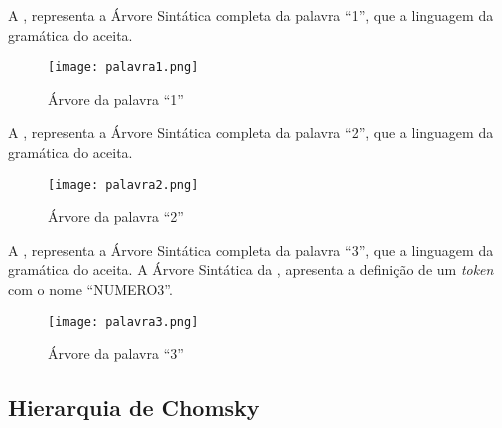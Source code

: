 A ,
representa a Árvore Sintática completa da palavra ``1'',
que a linguagem da gramática do  aceita.
\begin{figure}[H]
\caption{Árvore da palavra ``1''}
\label{Figure:palavra1}
\centering
\texttt{[image: palavra1.png]}
\end{figure}

A ,
representa a Árvore Sintática completa da palavra ``2'',
que a linguagem da gramática do  aceita.
\begin{figure}[H]
\caption{Árvore da palavra ``2''}
\label{Figure:palavra2}
\centering
\texttt{[image: palavra2.png]}
\end{figure}

A ,
representa a Árvore Sintática completa da palavra ``3'',
que a linguagem da gramática do  aceita.
A Árvore Sintática da ,
apresenta a definição de um \textit{token} com o nome ``NUMERO3''.
\begin{figure}[H]
\caption{Árvore da palavra ``3''}
\label{Figure:palavra3}
\centering
\texttt{[image: palavra3.png]}
\end{figure}


\subsection{Hierarquia de Chomsky}
\label{sectionHierarquiaDeChomsky}

